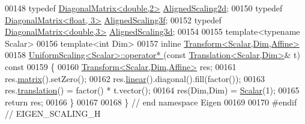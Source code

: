 \begin{DoxyCode}
00148 \textcolor{keyword}{typedef} \hyperlink{group___core___module_class_eigen_1_1_diagonal_matrix}{DiagonalMatrix<double,2>} \hyperlink{group___geometry___module_ga028f6f47e59a156fba3bd984363644bd}{AlignedScaling2d};
00150 \textcolor{keyword}{typedef} \hyperlink{group___core___module_class_eigen_1_1_diagonal_matrix}{DiagonalMatrix<float, 3>} \hyperlink{group___geometry___module_gaf07fc07f3188dad812b24f581985d3d4}{AlignedScaling3f};
00152 \textcolor{keyword}{typedef} \hyperlink{group___core___module_class_eigen_1_1_diagonal_matrix}{DiagonalMatrix<double,3>} \hyperlink{group___geometry___module_ga4362757fc0624ef024a7b56b256bfc86}{AlignedScaling3d};
00154 
00155 \textcolor{keyword}{template}<\textcolor{keyword}{typename} Scalar>
00156 \textcolor{keyword}{template}<\textcolor{keywordtype}{int} Dim>
00157 \textcolor{keyword}{inline} \hyperlink{group___geometry___module_class_eigen_1_1_transform}{Transform<Scalar,Dim,Affine>}
00158 \hyperlink{class_eigen_1_1_uniform_scaling_af3044cffe5703a1946c33a953b0f9bb6}{UniformScaling<Scalar>::operator* }(\textcolor{keyword}{const} 
      \hyperlink{group___geometry___module_class_eigen_1_1_translation}{Translation<Scalar,Dim>}& t)\textcolor{keyword}{ const}
00159 \textcolor{keyword}{}\{
00160   \hyperlink{group___geometry___module_class_eigen_1_1_transform}{Transform<Scalar,Dim,Affine>} res;
00161   res.\hyperlink{group___geometry___module_aec8168000a88a807130d41020af98d47}{matrix}().setZero();
00162   res.\hyperlink{group___geometry___module_a535bd63d047c2a36585c3f9b62219a1e}{linear}().diagonal().fill(factor());
00163   res.\hyperlink{group___geometry___module_afa93ba97d26912bb3d8777cbed102045}{translation}() = factor() * t.vector();
00164   res(Dim,Dim) = \hyperlink{class_eigen_1_1_uniform_scaling_a04c4339f58f1210c5d4d34b1bd7ae283}{Scalar}(1);
00165   \textcolor{keywordflow}{return} res;
00166 \}
00167 
00168 \} \textcolor{comment}{// end namespace Eigen}
00169 
00170 \textcolor{preprocessor}{#endif // EIGEN\_SCALING\_H}
\end{DoxyCode}

